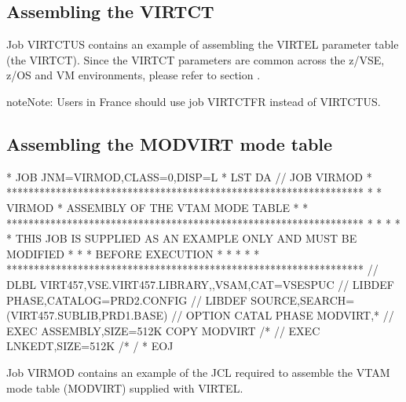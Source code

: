 \documentclass[letterpaper,10pt,english]{sphinxmanual}
\begin{document}
\subsection{Assembling the VIRTCT}
\label{\detokenize{Installation_Guide:assembling-the-virtct}}
Job VIRTCTUS contains an example of assembling the VIRTEL parameter table (the VIRTCT). Since the VIRTCT parameters are common across the z/VSE, z/OS and VM environments, please refer to section {\hyperref[\detokenize{Installation_Guide:v457ig-virtct}]{}}.

\begin{sphinxadmonition}{note}{Note:}
Users in France should use job VIRTCTFR instead of VIRTCTUS.
\end{sphinxadmonition}


\subsection{Assembling the MODVIRT mode table}
\label{\detokenize{Installation_Guide:assembling-the-modvirt-mode-table}}
\begin{sphinxVerbatim}[commandchars=\\\{\}]
* \PYGZdl{}\PYGZdl{} JOB JNM=VIRMOD,CLASS=0,DISP=L
* \PYGZdl{}\PYGZdl{} LST DA
// JOB VIRMOD
* *****************************************************************
* * VIRMOD * ASSEMBLY OF THE VTAM MODE TABLE *
* *****************************************************************
* * *
* * THIS JOB IS SUPPLIED AS AN EXAMPLE ONLY AND MUST BE MODIFIED *
* * BEFORE EXECUTION *
* * *
* *****************************************************************
// DLBL VIRT457,\PYGZsq{}VSE.VIRT457.LIBRARY\PYGZsq{},,VSAM,CAT=VSESPUC
// LIBDEF PHASE,CATALOG=PRD2.CONFIG
// LIBDEF SOURCE,SEARCH=(VIRT457.SUBLIB,PRD1.BASE)
// OPTION CATAL
  PHASE MODVIRT,*
// EXEC ASSEMBLY,SIZE=512K
  COPY MODVIRT
/*
// EXEC LNKEDT,SIZE=512K
/*
/\PYGZam{}
* \PYGZdl{}\PYGZdl{} EOJ
\end{sphinxVerbatim}


Job VIRMOD contains an example of the JCL required to assemble the VTAM mode table (MODVIRT) supplied with VIRTEL.
\end{document}
